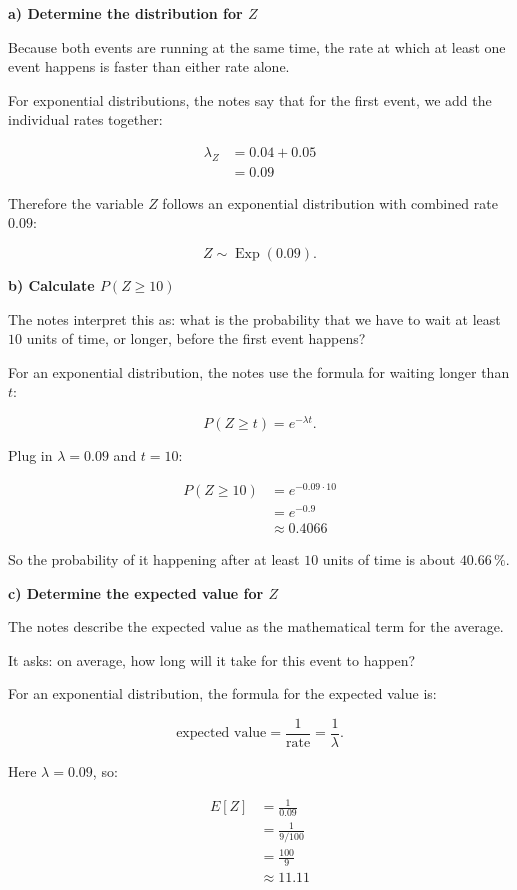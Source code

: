 \documentclass[10pt]{article}
\begin{document}
\RepeatedQuestion{\uppgiftThreeQuestion}
\textbf{a) Determine the distribution for $Z$}

Because both events are running at the same time,
the rate at which at least one event happens is faster
than either rate alone.

For exponential distributions, the notes say that for
the first event, we add the individual rates together:

\begin{align*}
\lambda_Z
&=0.04+0.05 \\[2mm]
&=0.09
\end{align*}

Therefore the variable $Z$ follows an exponential distribution
with combined rate $0.09$:

\[
Z\sim \operatorname{Exp}(0.09).
\]

\RepeatedQuestion{\uppgiftThreeQuestion}
\textbf{b) Calculate $P(Z\geq 10)$}

The notes interpret this as:
what is the probability that we have to wait at least
$10$ units of time, or longer, before the first event happens?

For an exponential distribution, the notes use the formula
for waiting longer than $t$:

\[
P(Z\geq t)=e^{-\lambda t}.
\]

Plug in $\lambda=0.09$ and $t=10$:

\begin{align*}
P(Z\geq 10)
&=e^{-0.09\cdot 10} \\[2mm]
&=e^{-0.9} \\[2mm]
&\approx 0.4066
\end{align*}

So the probability of it happening after at least
$10$ units of time is about $40.66\,\%$.

\RepeatedQuestion{\uppgiftThreeQuestion}
\textbf{c) Determine the expected value for $Z$}

The notes describe the expected value as the mathematical
term for the average.

It asks:
on average, how long will it take for this event to happen?

For an exponential distribution, the formula for the expected
value is:

\[
\text{expected value}
=\frac{1}{\text{rate}}
=\frac{1}{\lambda}.
\]

Here $\lambda=0.09$, so:

\begin{align*}
E[Z]
&=\frac{1}{0.09} \\[2mm]
&=\frac{1}{9/100} \\[2mm]
&=\frac{100}{9} \\[2mm]
&\approx 11.11
\end{align*}
\end{document}
